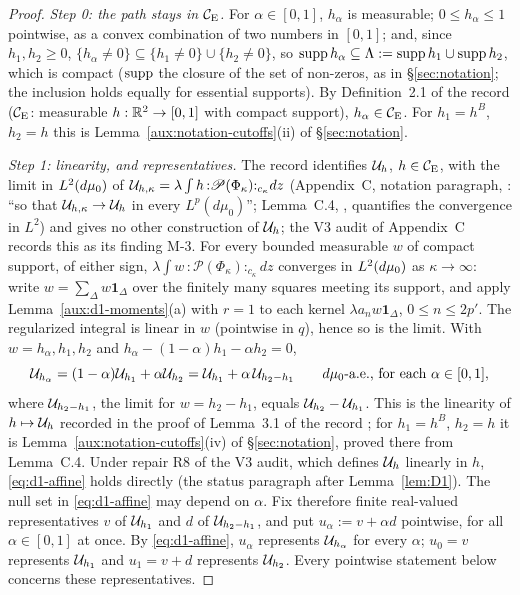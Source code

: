 \begin{proof}
\emph{Step 0: the path stays in $\mathcal{C}_{\mathrm E}$.} For $\alpha\in[0,1]$, $h_\alpha$ is measurable;
$0\le h_\alpha\le1$ pointwise, as a convex combination of two numbers in $[0,1]$; and, since
$h_1,h_2\ge0$, $\{h_\alpha\ne0\}\subseteq\{h_1\ne0\}\cup\{h_2\ne0\}$, so
$\operatorname{supp} h_\alpha\subseteq\Lambda:=\operatorname{supp} h_1\cup\operatorname{supp} h_2$, which is compact ($\operatorname{supp}$ the
closure of the set of non-zeros, as in \S\ref{sec:notation}; the inclusion holds equally for
essential supports). By Definition~2.1 of the record \cite[p.~7]{R} ($\mathcal{C}_{\mathrm E}$: measurable
$h:\mathbb{R}^2\to[0,1]$ with compact support), $h_\alpha\in\mathcal{C}_{\mathrm E}$. For $h_1=h^B$, $h_2=h$ this is
Lemma~\ref{aux:notation-cutoffs}(ii) of \S\ref{sec:notation}.

\emph{Step 1: linearity, and representatives.} The record identifies $\mathcal U_h$, $h\in\mathcal{C}_{\mathrm E}$,
with the limit in $L^2(d\mu_0)$ of $\mathcal U_{h,\kappa}=\lambda\int h\,{:}\mathscr
P(\Phi_\kappa){:}_{c_\kappa}dz$ (Appendix~C, notation paragraph, \cite[p.~39]{R}: ``so that
$\mathcal U_{h,\kappa}\to\mathcal U_h$ in every $L^p(d\mu_0)$''; Lemma~C.4, \cite[p.~40]{R}, quantifies the
convergence in $L^2$) and gives no other construction of $\mathcal U_h$; the V3 audit of Appendix~C
records this as its finding M-3. For every bounded measurable $w$ of compact support, of
either sign, $\lambda\int w\,{:}\mathscr P(\Phi_\kappa){:}_{c_\kappa}dz$ converges in
$L^2(d\mu_0)$ as $\kappa\to\infty$: write $w=\sum_\Delta w\mathbf 1_\Delta$ over the finitely many
squares meeting its support, and apply Lemma~\ref{aux:d1-moments}(a) with $r=1$ to each kernel
$\lambda a_nw\mathbf 1_\Delta$, $0\le n\le2p'$. The regularized integral is linear in $w$
(pointwise in $q$), hence so is the limit. With $w=h_\alpha,h_1,h_2$ and
$h_\alpha-(1-\alpha)h_1-\alpha h_2=0$,
\begin{equation}\label{eq:d1-affine}
 \mathcal U_{h_\alpha}=(1-\alpha)\mathcal U_{h_1}+\alpha\mathcal U_{h_2}=\mathcal U_{h_1}+\alpha\,\mathcal U_{h_2-h_1}
 \qquad d\mu_0\text{-a.e., for each }\alpha\in[0,1],
\end{equation}
where $\mathcal U_{h_2-h_1}$, the limit for $w=h_2-h_1$, equals $\mathcal U_{h_2}-\mathcal U_{h_1}$. This is the
linearity of $h\mapsto\mathcal U_h$ recorded in the proof of Lemma~3.1 of the record
\cite[p.~15]{R}; for $h_1=h^B$, $h_2=h$ it is Lemma~\ref{aux:notation-cutoffs}(iv) of
\S\ref{sec:notation}, proved there from Lemma~C.4.  Under repair R8 of the V3 audit, which
defines $\mathcal U_h$ linearly in $h$, \eqref{eq:d1-affine} holds directly (the status paragraph after
Lemma~\ref{lem:D1}).
The null set in \eqref{eq:d1-affine} may depend on $\alpha$. Fix therefore
finite real-valued representatives $v$ of $\mathcal U_{h_1}$ and $d$ of $\mathcal U_{h_2-h_1}$, and put
$u_\alpha:=v+\alpha d$ pointwise, for all $\alpha\in[0,1]$ at once. By
\eqref{eq:d1-affine}, $u_\alpha$ represents $\mathcal U_{h_\alpha}$ for every $\alpha$; $u_0=v$
represents $\mathcal U_{h_1}$ and $u_1=v+d$ represents $\mathcal U_{h_2}$. Every pointwise statement below
concerns these representatives.


\end{proof}
